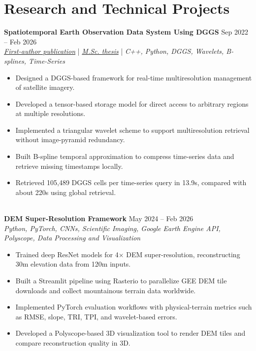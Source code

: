 \documentclass[a4paper,10pt]{article}
\begin{document}

\section*{Research and Technical Projects}

\noindent
\textbf{Spatiotemporal Earth Observation Data System Using DGGS} \hfill Sep 2022 -- Feb 2026 \\
\textit{\href{https://doi.org/10.3390/rs17040570}{First-author publication}} | \textit{\href{https://ucalgary.scholaris.ca/items/114b394b-e516-4732-bd3a-45dd6160d480}{M.Sc. thesis}} | \textit{C++, Python, DGGS, Wavelets, B-splines, Time-Series}
\begin{itemize}[leftmargin=0.25in]
    \item Designed a DGGS-based framework for real-time multiresolution management of satellite imagery.
    \item Developed a tensor-based storage model for direct access to arbitrary regions at multiple resolutions.
    \item Implemented a triangular wavelet scheme to support multiresolution retrieval without image-pyramid redundancy.
    \item Built B-spline temporal approximation to compress time-series data and retrieve missing timestamps locally.
    \item Retrieved 105,489 DGGS cells per time-series query in 13.9s, compared with about 220s using global retrieval.
\end{itemize}

\noindent \\
\textbf{DEM Super-Resolution Framework} \hfill May 2024 -- Feb 2026 \\
\textit{Python, PyTorch, CNNs, Scientific Imaging, Google Earth Engine API, Polyscope, Data Processing and Visualization}
\begin{itemize}[leftmargin=0.25in]
    \item Trained deep ResNet models for 4$\times$ DEM super-resolution, reconstructing 30m elevation data from 120m inputs.
    \item Built a Streamlit pipeline using Rasterio to parallelize GEE DEM tile downloads and collect mountainous terrain data worldwide.
    \item Implemented PyTorch evaluation workflows with physical-terrain metrics such as RMSE, slope, TRI, TPI, and wavelet-based errors.
    \item Developed a Polyscope-based 3D visualization tool to render DEM tiles and compare reconstruction quality in 3D.
\end{itemize}
\end{document}
